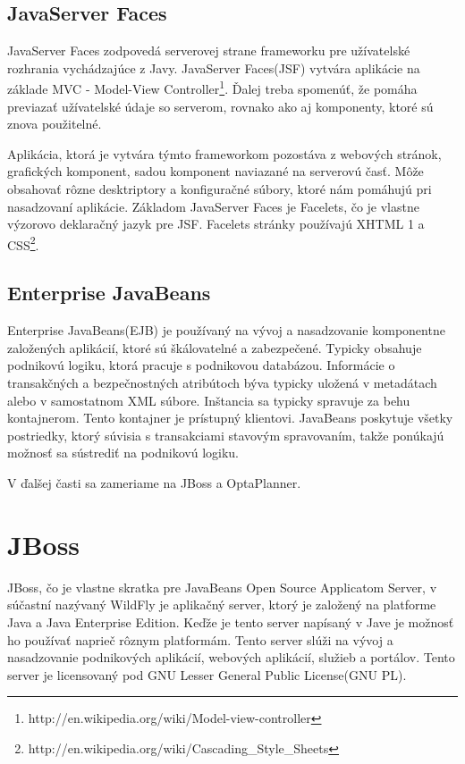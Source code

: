 \section{JavaServer Faces}
JavaServer Faces zodpovedá serverovej strane frameworku pre užívatelské rozhrania vychádzajúce z Javy. JavaServer Faces(JSF) vytvára aplikácie na základe MVC - Model-View Controller\footnote{http://en.wikipedia.org/wiki/Model-view-controller}. Ďalej treba spomenúť, že pomáha previazať užívatelské údaje so serverom, rovnako ako aj komponenty, ktoré sú znova použitelné.

\indent Aplikácia, ktorá je vytvára týmto frameworkom pozostáva z webových stránok, grafických komponent, sadou komponent naviazané na serverovú časť. Môže obsahovať rôzne desktriptory a konfiguračné súbory, ktoré nám pomáhujú pri nasadzovaní aplikácie. Základom JavaServer Faces je Facelets, čo je vlastne výzorovo deklaračný jazyk pre JSF. Facelets stránky používajú XHTML 1 a CSS\footnote{http://en.wikipedia.org/wiki/Cascading\_Style\_Sheets}. 

\section{Enterprise JavaBeans}
Enterprise JavaBeans(EJB) je používaný na vývoj a nasadzovanie komponentne založených aplikácií, ktoré sú škálovatelné a zabezpečené. Typicky obsahuje podnikovú logiku, ktorá pracuje s podnikovou databázou. Informácie o transakčných a bezpečnostných atribútoch býva typicky uložená v metadátach alebo v samostatnom XML súbore. Inštancia sa typicky spravuje za behu kontajnerom. Tento kontajner je prístupný klientovi. JavaBeans poskytuje všetky postriedky, ktorý súvisia s transakciami stavovým spravovaním, takže ponúkajú možnosť sa sústrediť na podnikovú logiku. 

V ďalšej časti sa zameriame na JBoss a OptaPlanner.


\chapter{JBoss} 
JBoss, čo je vlastne skratka pre JavaBeans Open Source Applicatom Server, v súčastní nazývaný WildFly je aplikačný server, ktorý je založený na platforme Java a Java Enterprise Edition.\cite{jbossWeb} Keďže je tento server napísaný v Jave je možnosť ho používať naprieč rôznym platformám. Tento server slúži na vývoj a nasadzovanie podnikových aplikácií, webových aplikácií, služieb a portálov. Tento server je licensovaný pod GNU Lesser General Public License(GNU PL).


